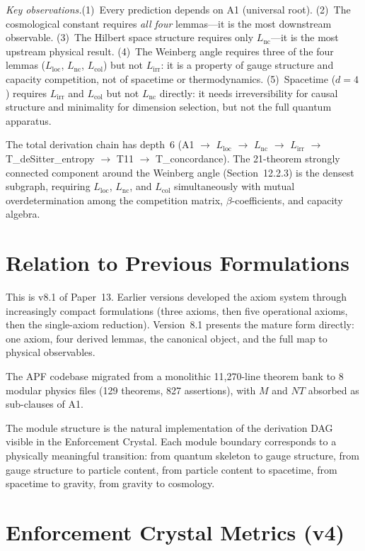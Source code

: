 \documentclass[11pt]{article}
\newcommand{\Lnc}{L_{\mathrm{nc}}}
\newcommand{\Lloc}{L_{\mathrm{loc}}}
\newcommand{\Lirr}{L_{\mathrm{irr}}}
\newcommand{\Lcol}{L_{\mathrm{col}}}
\begin{document}
\noindent\textit{Key observations.}\quad (1)~Every prediction depends on A1 (universal root).  (2)~The cosmological constant requires \emph{all four} lemmas---it is the most downstream observable.  (3)~The Hilbert space structure requires only $\Lnc$---it is the most upstream physical result.  (4)~The Weinberg angle requires three of the four lemmas ($\Lloc$, $\Lnc$, $\Lcol$) but not $\Lirr$: it is a property of gauge structure and capacity competition, not of spacetime or thermodynamics.  (5)~Spacetime ($d = 4$) requires $\Lirr$ and $\Lcol$ but not $\Lnc$ directly: it needs irreversibility for causal structure and minimality for dimension selection, but not the full quantum apparatus.

The total derivation chain has depth~6 (A1 $\to$ $\Lloc$ $\to$ $\Lnc$ $\to$ $\Lirr$ $\to$ T\_deSitter\_entropy $\to$ T11 $\to$ T\_concordance).  The 21-theorem strongly connected component around the Weinberg angle (Section~12.2.3) is the densest subgraph, requiring $\Lloc$, $\Lnc$, and $\Lcol$ simultaneously with mutual overdetermination among the competition matrix, $\beta$-coefficients, and capacity algebra.


\section{Relation to Previous Formulations}

This is v8.1 of Paper~13.  Earlier versions developed the axiom system through increasingly compact formulations (three axioms, then five operational axioms, then the single-axiom reduction).  Version~8.1 presents the mature form directly: one axiom, four derived lemmas, the canonical object, and the full map to physical observables.

The APF codebase migrated from a monolithic 11,270-line theorem bank to 8 modular physics files (129 theorems, 827 assertions), with $M$ and $NT$ absorbed as sub-clauses of A1.

The module structure is the natural implementation of the derivation DAG visible in the Enforcement Crystal.  Each module boundary corresponds to a physically meaningful transition: from quantum skeleton to gauge structure, from gauge structure to particle content, from particle content to spacetime, from spacetime to gravity, from gravity to cosmology.


\section{Enforcement Crystal Metrics (v4)}
\end{document}
